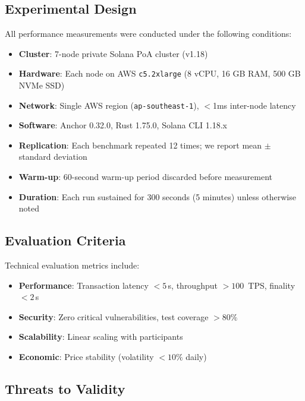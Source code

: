 \documentclass[conference]{IEEEtran}
\begin{document}
\subsection{Experimental Design}
\label{sec:exp-design}

All performance measurements were conducted under the following conditions:

\begin{itemize}
    \item \textbf{Cluster}: 7-node private Solana PoA cluster (v1.18)
    \item \textbf{Hardware}: Each node on AWS \texttt{c5.2xlarge} (8 vCPU, 16 GB RAM, 500 GB NVMe SSD)
    \item \textbf{Network}: Single AWS region (\texttt{ap-southeast-1}), $<$1ms inter-node latency
    \item \textbf{Software}: Anchor 0.32.0, Rust 1.75.0, Solana CLI 1.18.x
    \item \textbf{Replication}: Each benchmark repeated 12 times; we report mean $\pm$ standard deviation
    \item \textbf{Warm-up}: 60-second warm-up period discarded before measurement
    \item \textbf{Duration}: Each run sustained for 300 seconds (5 minutes) unless otherwise noted
\end{itemize}

\subsection{Evaluation Criteria}

Technical evaluation metrics include:
\begin{itemize}
    \item \textbf{Performance}: Transaction latency $< 5$\,s, throughput $> 100$~TPS, finality $< 2$\,s
    \item \textbf{Security}: Zero critical vulnerabilities, test coverage $> 80\%$
    \item \textbf{Scalability}: Linear scaling with participants
    \item \textbf{Economic}: Price stability (volatility $< 10\%$ daily)
\end{itemize}

\subsection{Threats to Validity}
\label{sec:threats}
\end{document}
